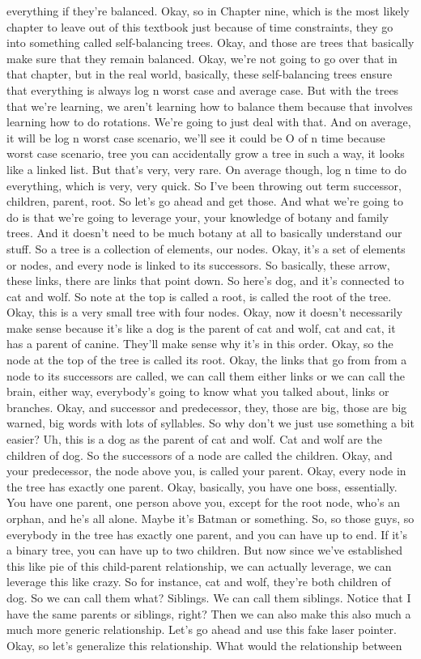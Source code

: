 everything if they're balanced. Okay, so in Chapter nine, which is the most likely chapter to leave out of this textbook just because of time constraints, they go into something called self-balancing trees. Okay, and those are trees that basically make sure that they remain balanced. Okay, we're not going to go over that in that chapter, but in the real world, basically, these self-balancing trees ensure that everything is always log n worst case and average case. But with the trees that we're learning, we aren't learning how to balance them because that involves learning how to do rotations. We're going to just deal with that. And on average, it will be log n worst case scenario, we'll see it could be O of n time because worst case scenario, tree you can accidentally grow a tree in such a way, it looks like a linked list. But that's very, very rare. On average though, log n time to do everything, which is very, very quick. So I've been throwing out term successor, children, parent, root. So let's go ahead and get those. And what we're going to do is that we're going to leverage your, your knowledge of botany and family trees. And it doesn't need to be much botany at all to basically understand our stuff. So a tree is a collection of elements, our nodes. Okay, it's a set of elements or nodes, and every node is linked to its successors. So basically, these arrow, these links, there are links that point down. So here's dog, and it's connected to cat and wolf. So note at the top is called a root, is called the root of the tree. Okay, this is a very small tree with four nodes. Okay, now it doesn't necessarily make sense because it's like a dog is the parent of cat and wolf, cat and cat, it has a parent of canine. They'll make sense why it's in this order. Okay, so the node at the top of the tree is called its root. Okay, the links that go from from a node to its successors are called, we can call them either links or we can call the brain, either way, everybody's going to know what you talked about, links or branches. Okay, and successor and predecessor, they, those are big, those are big warned, big words with lots of syllables. So why don't we just use something a bit easier? Uh, this is a dog as the parent of cat and wolf. Cat and wolf are the children of dog. So the successors of a node are called the children. Okay, and your predecessor, the node above you, is called your parent. Okay, every node in the tree has exactly one parent. Okay, basically, you have one boss, essentially. You have one parent, one person above you, except for the root node, who's an orphan, and he's all alone. Maybe it's Batman or something. So, so those guys, so everybody in the tree has exactly one parent, and you can have up to end. If it's a binary tree, you can have up to two children. But now since we've established this like pie of this child-parent relationship, we can actually leverage, we can leverage this like crazy. So for instance, cat and wolf, they're both children of dog. So we can call them what? Siblings. We can call them siblings. Notice that I have the same parents or siblings, right? Then we can also make this also much a much more generic relationship. Let's go ahead and use this fake laser pointer. Okay, so let's generalize this relationship. What would the relationship between 